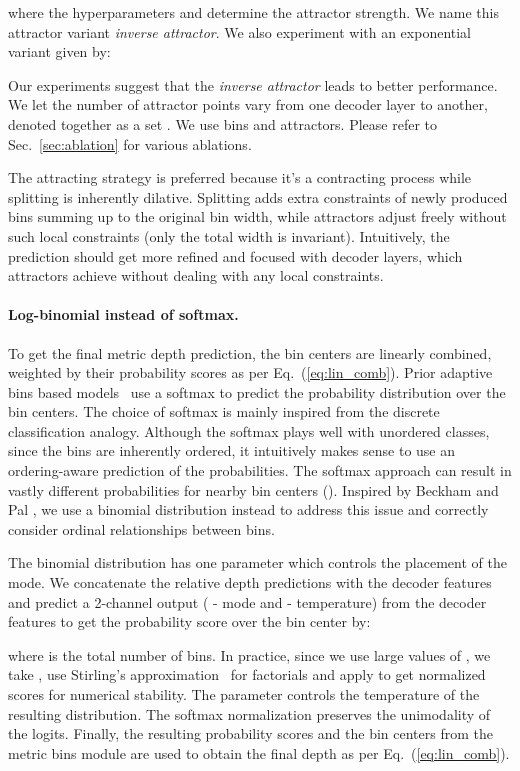 \documentclass[10pt,twocolumn,letterpaper]{article}
\begin{document}
where the hyperparameters  and  determine the attractor strength. We name this attractor variant \textit{inverse attractor}. We also experiment with an exponential variant given by:
    

Our experiments suggest that the \textit{inverse attractor} leads to better performance. 
We let the number of attractor points vary from one decoder layer to another, denoted together as a set . We use  bins and  attractors. Please refer to Sec.~\ref{sec:ablation} for various ablations.

The attracting strategy is preferred because it's a contracting process while splitting is inherently dilative. Splitting adds extra constraints of newly produced bins summing up to the original bin width, while attractors adjust freely without such local constraints (only the total width is invariant). Intuitively, the prediction should get more refined and focused with decoder layers, which attractors achieve without dealing with any local constraints.

\paragraph{Log-binomial instead of softmax.}
To get the final metric depth prediction, the bin centers are linearly combined, weighted by their probability scores as per Eq.~(\ref{eq:lin_comb}). Prior adaptive bins based models~\cite{bhat2021adabins,bhat2022localbins,li2022binsformer,agarwal2022attention} use a softmax to predict the probability distribution over the bin centers. The choice of softmax is mainly inspired from the discrete classification analogy. Although the softmax plays well with unordered classes, since the bins are inherently ordered, it intuitively makes sense to use an ordering-aware prediction of the probabilities. The softmax approach can result in vastly different probabilities for nearby bin centers ({\scriptsize }).
Inspired by Beckham and Pal \cite{unimodal-pmlr-v70-beckham17a}, we use a binomial distribution instead to address this issue and correctly consider ordinal relationships between bins. 

The binomial distribution has one parameter  which controls the placement of the mode. We concatenate the relative depth predictions with the decoder features and predict a 2-channel output ( - mode and  - temperature) from the decoder features to get the probability score over the  bin center by: 

where  is the total number of bins. In practice, since we use large values of , we take , use Stirling's approximation~\cite{abramowitz2002stegun} for factorials and apply  to get normalized scores for numerical stability. The parameter  controls the temperature of the resulting distribution. The softmax normalization preserves the unimodality of the logits. 
Finally, the resulting probability scores and the bin centers from the metric bins module are used to obtain the final depth as per Eq.~(\ref{eq:lin_comb}).
\end{document}
